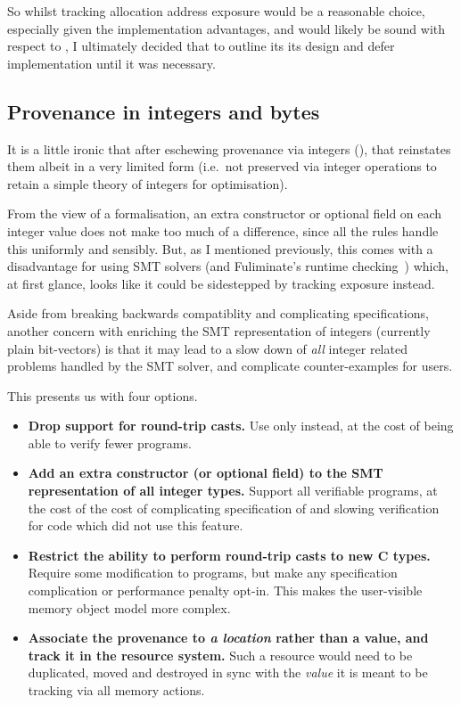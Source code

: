 So whilst tracking allocation address exposure would be a reasonable choice,
especially given the implementation advantages, and would likely be sound with
respect to , I ultimately decided that to outline its
its design and defer implementation until it was necessary.

\subsection{Provenance in integers and bytes}\label{subsec:prov-int-bytes}

It is a little ironic that after eschewing provenance via integers (),
that  reinstates them albeit in a very limited form (i.e.\ not preserved
via integer operations to retain a simple theory of integers for optimisation).

From the view of a formalisation, an extra constructor or optional field on
each integer value does not make too much of a difference, since all the rules
handle this uniformly and sensibly. But, as I mentioned previously, this comes
with a disadvantage for using SMT solvers (and Fuliminate's runtime
checking~\cite{banerjee2023fulminate}) which, at first glance, looks like it
could be sidestepped by tracking exposure instead.

Aside from breaking backwards compatiblity and complicating specifications,
another concern with enriching the SMT representation of integers (currently
plain bit-vectors) is that it may lead to a slow down of \emph{all} integer
related problems handled by the SMT solver, and complicate counter-examples for
users.

This presents us with four options.
\begin{itemize}
    \item \textbf{Drop support for round-trip casts.} Use only
         instead, at the cost of being able
        to verify fewer programs.
    \item \textbf{Add an extra constructor (or optional field) to the SMT
        representation of all integer types.} Support all  verifiable
        programs, at the cost of the cost of complicating specification of
        and slowing verification for code which did not use this feature.
    \item \textbf{Restrict the ability to perform round-trip casts to new C
        types.} Require some modification to  programs, but
        make any specification complication or performance penalty opt-in. This
        makes the user-visible memory object model more complex.\label{sn:optin-typedef}
    \item \textbf{Associate the provenance to \emph{a location} rather than a
        value, and track it in the resource system.} Such a resource would need
        to be duplicated, moved and destroyed in sync with the \emph{value} it
        is meant to be tracking via all memory actions.
\end{itemize}

